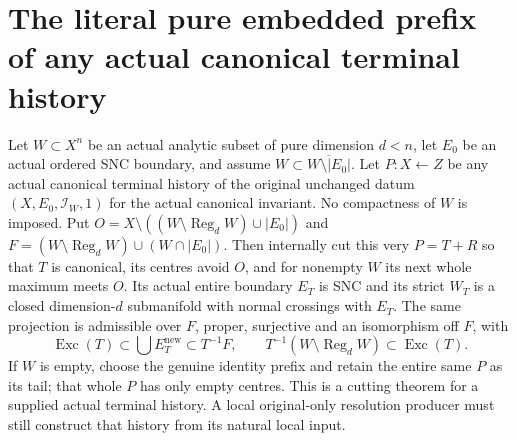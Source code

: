 \section{The literal pure embedded prefix of any actual canonical terminal history}

\begin{theorem}
\label{hir:original-pure-boundary-given-terminal-first-prefix}
\leanok
Let $W\subset X^n$ be an actual analytic subset of pure dimension $d<n$,
let $E_0$ be an actual ordered SNC boundary, and assume
$W\subset\overline{W\setminus|E_0|}$. Let $P:X\leftarrow Z$ be any
actual canonical terminal history of the original unchanged datum
$(X,E_0,\mathcal I_W,1)$ for the actual canonical invariant. No
compactness of $W$ is imposed. Put
$O=X\setminus((W\setminus\operatorname{Reg}_dW)\cup|E_0|)$ and
$F=(W\setminus\operatorname{Reg}_dW)\cup(W\cap|E_0|)$.
Then internally cut this very $P=T\mathbin{+}R$ so that $T$ is canonical,
its centres avoid $O$, and for nonempty $W$ its next whole maximum meets
$O$. Its actual entire boundary $E_T$ is SNC and its strict $W_T$ is a
closed dimension-$d$ submanifold with normal crossings with $E_T$.
The same projection is admissible over $F$, proper, surjective and an
isomorphism off $F$, with
\[
 \operatorname{Exc}(T)\subset\bigcup E_T^{\mathrm{new}}
 \subset T^{-1}F,\qquad
 T^{-1}(W\setminus\operatorname{Reg}_dW)\subset\operatorname{Exc}(T).
\]
If $W$ is empty, choose the genuine identity prefix and retain the entire
same $P$ as its tail; that whole $P$ has only empty centres. This is a
cutting theorem for a supplied actual terminal history. A local
original-only resolution producer must still construct that history from
its natural local input.
\end{theorem}
